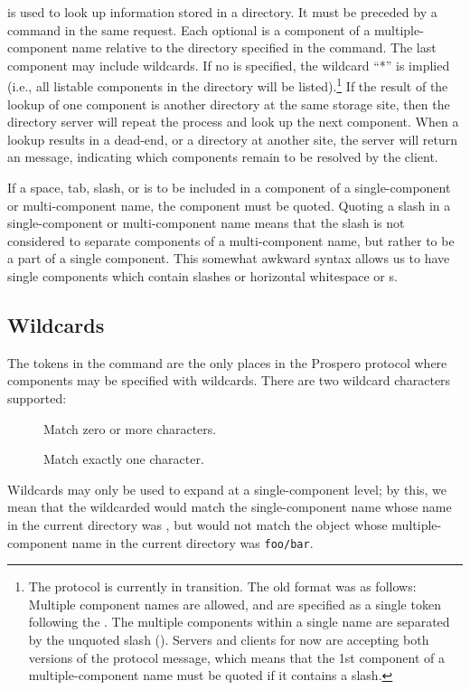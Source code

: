  is used to look up information stored in a directory.  It
must be preceded by a  command in the same request.  Each
optional  is a component of a
multiple-component name relative to the directory specified in the
 command.  The last component may include wildcards.  If no
 is specified, the wildcard ``*'' is implied
(i.e., all listable components in the directory will be listed).\footnote{
The protocol is currently in transition.  The old format was as
follows:
Multiple component names are allowed, and are specified as a single
token following the .  The multiple components within
a single name are separated by the unquoted slash (\lit{/}).  Servers
and clients for now are accepting both versions of the protocol
message, which means that the 1st component of a multiple-component
name must be quoted if it contains a slash.}
  If the result of
the lookup of one component is another directory at the same storage
site, then the directory server will repeat the process and look up
the next component.  When a lookup results in a dead-end, or a
directory at another site, the server will return an 
message, indicating which components remain to be resolved by the client.

If a space, tab, slash, or  is to be included in a component
of a single-component or multi-component name, the component must be
quoted.  Quoting a slash in a single-component or multi-component name
means that the slash is not considered to separate components of a
multi-component name, but rather to be a part of a single component.
This somewhat awkward syntax allows us to have single components
which contain slashes or horizontal whitespace or s.

\subsection{Wildcards}

The  tokens in the  command are the
only places in the Prospero protocol where components may be specified
with wildcards.    There are two wildcard characters supported:
\begin{description}
\item[\lit{*}] Match zero or more characters.   
\item[] Match exactly one character.  
\end{description}
Wildcards may only be used to expand at a single-component level; by
this, we mean that the wildcarded 
 would match the single-component name whose name in
the current directory was ,
but would not match the object whose multiple-component name in the
current directory was \verb"foo/bar".

